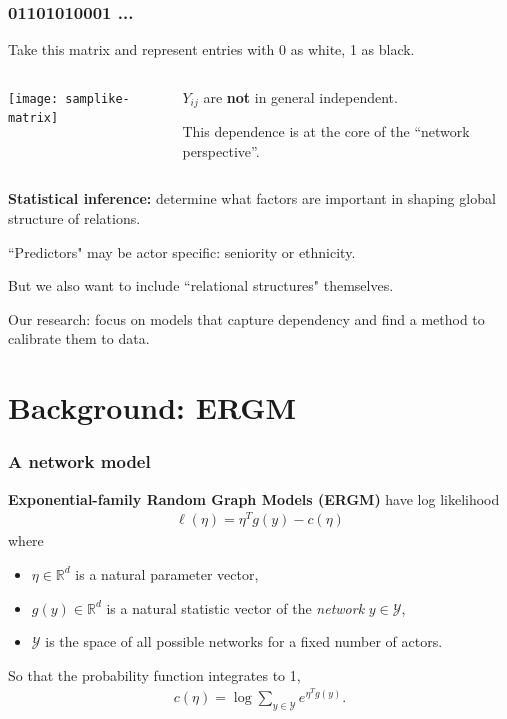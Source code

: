 \documentclass[ 10pt]{beamer}
\def\RR{{\mathbb R}}
\def\YY{{\mathcal Y}}
\newcommand{\fatdot}{\,\cdot\,}
\newcommand{\inner}[1]{\langle #1 \rangle}
\begin{document}
{
\frametitle{01101010001 ...}
Take this matrix and represent entries with 0 as white, 1 as black.
\pause
\begin{columns}[T]
\begin{column}[T]{0.4\textwidth}
\texttt{[image: samplike-matrix]}
\end{column}
\pause
\begin{column}[T]{0.6\textwidth}
\vspace{5mm}

$Y_{ij}$ are \textbf{not} in general independent.
\vspace{2mm}

This dependence is at the core of the ``network perspective''.
\end{column}
\end{columns}
\vspace{2mm}

\pause
\textbf{Statistical inference:} determine what factors are important in shaping 
global structure of relations.  
\vspace{1mm}

``Predictors" may be actor specific: seniority or ethnicity.

But we also want to include ``relational structures" themselves.


\begin{block}{}
Our research: focus on models that capture dependency and find a method to calibrate them to data.
\end{block}
}
\section{Background: ERGM}
\frame
{
\frametitle{A network model}


\textbf{Exponential-family Random Graph Models (ERGM)} have log likelihood
\begin{align*}%
	\ell( \eta) = \eta^T g(y) - c(\eta)
\end{align*}
where 
\begin{itemize}
\item $\eta \in \RR^d$ is a natural parameter vector,
\item $g(y)\in\RR^d$ is a natural statistic vector of the \emph{network} $y\in \YY$,
\item $\YY$ is the space of all possible networks for a fixed number of actors.
\end{itemize}
\vspace{2mm}

So that the probability function integrates to 1,
\begin{align*}
	c(\eta) = \log \sum_{y \in \YY} e^{\eta^T g(y) }.
\end{align*}
}
\end{document}
